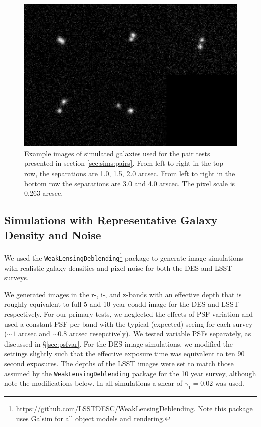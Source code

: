 \documentclass[fleqn,useAMS,usenatbib]{mnras}
\begin{document}
\begin{figure}
    \includegraphics[width=\textwidth]{figures/bdk-comb.png}
    \caption{Example images of simulated galaxies used for the pair tests
    presented in section \ref{sec:sims:pairs}.  From left to right in the top row,
    the separations are 1.0, 1.5, 2.0 arcsec. From left to right in the bottom row the
    separations are 3.0 and 4.0 arscec. The pixel scale is 0.263 arcsec.
    \label{fig:pairs}}
\end{figure}

\subsection{Simulations with Representative Galaxy Density and Noise}
\label{sec:sims:realgals}

We used the
\texttt{WeakLensingDeblending}\footnote{\url{https://github.com/LSSTDESC/WeakLensingDeblending}.
Note this package uses Galsim for all object models and rendering.} package to
generate image simulations with realistic galaxy densities and pixel noise for
both the DES and LSST surveys.

We generated images in the r-, i-, and z-bands with an effective depth that is
roughly equivalent to full 5 and 10 year coadd image for the DES and LSST
respectively. For our primary tests, we neglected the effects of PSF variation
and used a constant PSF per-band with the typical (expected) seeing for each
survey ($\sim\!1$ arcsec and $\sim\!0.8$ arcsec resepctively). We tested
variable PSFs separately, as discussed in \S \ref{sec:psfvar}.  For the DES
image simulations, we modified the settings slightly such that the effective
exposure time was equivalent to ten 90 second exposures. The depths of the LSST
images were set to match those assumed by the \texttt{WeakLensingDeblending}
package for the 10 year survey, although note the modifications below. In all
simulations a shear of $\gamma_1 = 0.02$ was used.
\end{document}
